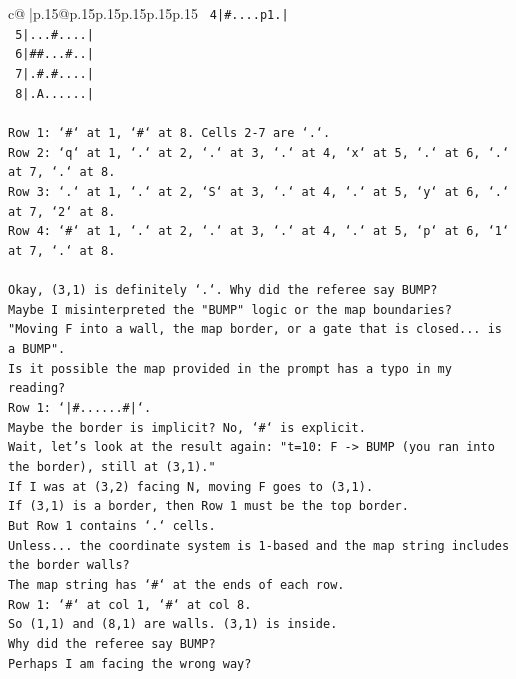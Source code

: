 \documentclass{article}
\begin{document}
{\begin{supertabular}{c@{$\;$}|p{.15\linewidth}@{}p{.15\linewidth}p{.15\linewidth}p{.15\linewidth}p{.15\linewidth}p{.15\linewidth}}
{{{\texttt{ 4|\#....p1.|} \\
\texttt{ 5|...\#....|} \\
\texttt{ 6|\#\#...\#..|} \\
\texttt{ 7|.\#.\#....|} \\
\texttt{ 8|.A......|} \\
\\ 
\texttt{Row 1: `\#` at 1, `\#` at 8. Cells 2{-}7 are `.`.} \\
\texttt{Row 2: `q` at 1, `.` at 2, `.` at 3, `.` at 4, `x` at 5, `.` at 6, `.` at 7, `.` at 8.} \\
\texttt{Row 3: `.` at 1, `.` at 2, `S` at 3, `.` at 4, `.` at 5, `y` at 6, `.` at 7, `2` at 8.} \\
\texttt{Row 4: `\#` at 1, `.` at 2, `.` at 3, `.` at 4, `.` at 5, `p` at 6, `1` at 7, `.` at 8.} \\
\\ 
\texttt{Okay, (3,1) is definitely `.`. Why did the referee say BUMP?} \\
\texttt{Maybe I misinterpreted the "BUMP" logic or the map boundaries?} \\
\texttt{"Moving F into a wall, the map border, or a gate that is closed... is a BUMP".} \\
\texttt{Is it possible the map provided in the prompt has a typo in my reading?} \\
\texttt{Row 1: `|\#......\#|`.} \\
\texttt{Maybe the border is implicit? No, `\#` is explicit.} \\
\texttt{Wait, let's look at the result again: "t=10: F {-}> BUMP (you ran into the border), still at (3,1)."} \\
\texttt{If I was at (3,2) facing N, moving F goes to (3,1).} \\
\texttt{If (3,1) is a border, then Row 1 must be the top border.} \\
\texttt{But Row 1 contains `.` cells.} \\
\texttt{Unless... the coordinate system is 1{-}based and the map string includes the border walls?} \\
\texttt{The map string has `\#` at the ends of each row.} \\
\texttt{Row 1: `\#` at col 1, `\#` at col 8.} \\
\texttt{So (1,1) and (8,1) are walls. (3,1) is inside.} \\
\texttt{Why did the referee say BUMP?} \\
\texttt{Perhaps I am facing the wrong way?} \\
}}}
\end{supertabular}}
\end{document}

